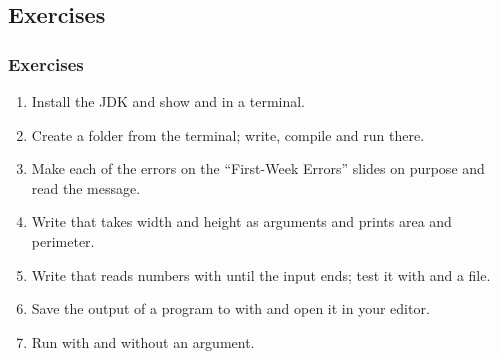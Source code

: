 \documentclass[aspectratio=169,10pt,compress]{beamer}
\begin{document}
\subsection[Exercises]{Exercises}




\begin{frame}[t,fragile] \frametitle{Exercises}
  \begin{enumerate}\small
    \item Install the JDK and show  and  in a terminal.
    \item Create a folder  from the terminal; write, compile and run  there.
    \item Make each of the errors on the ``First-Week Errors'' slides on purpose and read the message.
    \item Write  that takes width and height as arguments and prints area and perimeter.
    \item Write  that reads numbers with  until the input ends; test it with \hCode{<} and a file.
    \item Save the output of a program to  with \hCode{>} and open it in your editor.
    \item Run  with and without an argument.
  \end{enumerate}
\end{frame}




\begin{frame}[t,fragile]
	\begin{center}
		\vspace{4cm}
	\end{center}
\end{frame}
\end{document}
